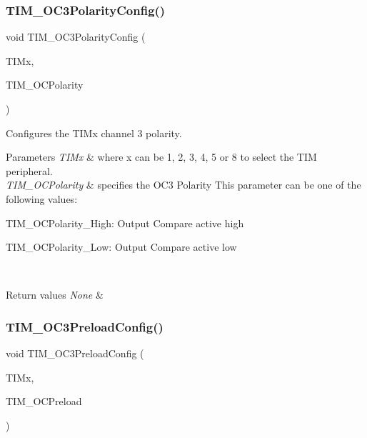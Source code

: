 \subsubsection{\texorpdfstring{TIM\_OC3PolarityConfig()}{TIM\_OC3PolarityConfig()}}
{\footnotesize\ttfamily void T\+I\+M\+\_\+\+O\+C3\+Polarity\+Config (\begin{DoxyParamCaption}\item[{\mbox{\hyperlink{struct_t_i_m___type_def}{T\+I\+M\+\_\+\+Type\+Def}} $\ast$}]{T\+I\+Mx,  }\item[{uint16\+\_\+t}]{T\+I\+M\+\_\+\+O\+C\+Polarity }\end{DoxyParamCaption})}



Configures the T\+I\+Mx channel 3 polarity. 


\begin{DoxyParams}{Parameters}
{\em T\+I\+Mx} & where x can be 1, 2, 3, 4, 5 or 8 to select the T\+IM peripheral. \\
\hline
{\em T\+I\+M\+\_\+\+O\+C\+Polarity} & specifies the O\+C3 Polarity This parameter can be one of the following values\+: \begin{DoxyItemize}
\item T\+I\+M\+\_\+\+O\+C\+Polarity\+\_\+\+High\+: Output Compare active high \item T\+I\+M\+\_\+\+O\+C\+Polarity\+\_\+\+Low\+: Output Compare active low \end{DoxyItemize}
\\
\hline
\end{DoxyParams}

\begin{DoxyRetVals}{Return values}
{\em None} & \\
\hline
\end{DoxyRetVals}
\mbox{\label{group___t_i_m___private___functions_ga8b2391685a519e60e596b7d596f86f09}} 
\subsubsection{\texorpdfstring{TIM\_OC3PreloadConfig()}{TIM\_OC3PreloadConfig()}}
{\footnotesize\ttfamily void T\+I\+M\+\_\+\+O\+C3\+Preload\+Config (\begin{DoxyParamCaption}\item[{\mbox{\hyperlink{struct_t_i_m___type_def}{T\+I\+M\+\_\+\+Type\+Def}} $\ast$}]{T\+I\+Mx,  }\item[{uint16\+\_\+t}]{T\+I\+M\+\_\+\+O\+C\+Preload }\end{DoxyParamCaption})}




